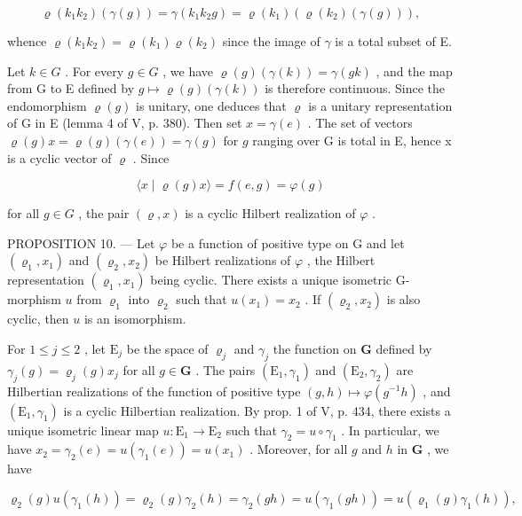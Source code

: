 \[
\varrho (k _ {1} k _ {2}) (\gamma (g)) = \gamma (k _ {1} k _ {2} g) = \varrho (k _ {1}) (\varrho (k _ {2}) (\gamma (g))),
\]

whence \(\varrho(k_1k_2) = \varrho(k_1)\varrho(k_2)\) since the image of \(\gamma\) is a total subset of E.

Let \(k \in G\) . For every \(g \in G\) , we have \(\varrho(g)(\gamma(k)) = \gamma(gk)\) , and the map from G to E defined by \(g \mapsto \varrho(g)(\gamma(k))\) is therefore continuous. Since the endomorphism \(\varrho(g)\) is unitary, one deduces that \(\varrho\) is a unitary representation of G in E (lemma 4 of V, p. 380). Then set \(x = \gamma(e)\) . The set of vectors \(\varrho(g)x = \varrho(g)(\gamma(e)) = \gamma(g)\) for \(g\) ranging over G is total in E, hence x is a cyclic vector of \(\varrho\) . Since

\[
\langle x \mid \varrho (g) x \rangle = f (e, g) = \varphi (g)
\]

for all \(g \in G\) , the pair \((\varrho, x)\) is a cyclic Hilbert realization of \(\varphi\) .

PROPOSITION 10. — Let \(\varphi\) be a function of positive type on G and let \((\varrho_{1}, x_{1})\) and \((\varrho_{2}, x_{2})\) be Hilbert realizations of \(\varphi\) , the Hilbert representation \((\varrho_{1}, x_{1})\) being cyclic. There exists a unique isometric G-morphism \(u\) from \(\varrho_{1}\) into \(\varrho_{2}\) such that \(u(x_{1}) = x_{2}\) . If \((\varrho_{2}, x_{2})\) is also cyclic, then \(u\) is an isomorphism.

For \(1 \leqslant j \leqslant 2\) , let \(\mathrm{E}_j\) be the space of \(\varrho_j\) and \(\gamma_j\) the function on \(\mathbf{G}\) defined by \(\gamma_j(g) = \varrho_j(g)x_j\) for all \(g \in \mathbf{G}\) . The pairs \((\mathrm{E}_1, \gamma_1)\) and \((\mathrm{E}_2, \gamma_2)\) are Hilbertian realizations of the function of positive type \((g, h) \mapsto \varphi(g^{-1}h)\) , and \((\mathrm{E}_1, \gamma_1)\) is a cyclic Hilbertian realization. By prop. 1 of V, p. 434, there exists a unique isometric linear map \(u: \mathrm{E}_1 \to \mathrm{E}_2\) such that \(\gamma_2 = u \circ \gamma_1\) . In particular, we have \(x_2 = \gamma_2(e) = u(\gamma_1(e)) = u(x_1)\) . Moreover, for all \(g\) and \(h\) in \(\mathbf{G}\) , we have

\[
\varrho_ {2} (g) u \left(\gamma_ {1} (h)\right) = \varrho_ {2} (g) \gamma_ {2} (h) = \gamma_ {2} (g h) = u \left(\gamma_ {1} (g h)\right) = u \left(\varrho_ {1} (g) \gamma_ {1} (h)\right),
\]

